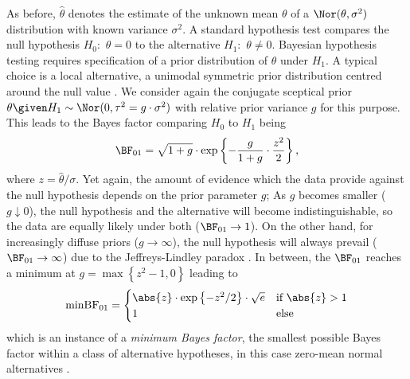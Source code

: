 As before, $\hat \theta$ denotes the estimate of the unknown mean $\theta$ of a
$\Nor(\theta, \sigma^2)$ distribution with known variance $\sigma^2$. A standard
hypothesis test compares the null hypothesis $H_0\colon$ $\theta = 0$ to the
alternative $H_1\colon$ $\theta \neq 0$. Bayesian hypothesis testing requires
specification of a prior distribution of $\theta$ under $H_1$. A typical choice
is a local alternative, a unimodal symmetric prior distribution centred around
the null value \citep{Johnson2010}. We consider again the conjugate sceptical
prior $\theta \given H_1 \sim \Nor(0, \tau^2 = g \cdot \sigma^2)$ with relative
prior variance $g$ for this purpose. This leads to the Bayes factor comparing
$H_0$ to $H_1$ being
\begin{align}
  \label{eq4:bf01}
  \BF_{01} =
  \sqrt{1 + g} \cdot
  \exp\left\{-\frac{g}{1 + g} \cdot \frac{z^2}{2} \right\},
\end{align}
where $z=\hat \theta/\sigma$. Yet again, the amount of evidence which the data
provide against the null hypothesis depends on the prior parameter $g$; As $g$
becomes smaller ($g \downarrow 0$), the null hypothesis and the alternative will
become indistinguishable, so the data are equally likely under both
($\BF_{01} \to 1$). On the other hand, for increasingly diffuse priors
($g \to \infty$), the null hypothesis will always prevail
($\BF_{01} \to \infty$) due to the Jeffreys-Lindley paradox \citep{Robert2014}.
In between, the $\BF_{01}$ reaches a minimum at
$g = \max\left\{z^2 - 1, 0\right\}$ leading to
\begin{align}
  \text{minBF}_{01} =
  \begin{cases}
    \abs{z} \cdot \exp\left\{-z^2/2\right\} \cdot \sqrt{e}
    & \text{if} ~ \abs{z} > 1 \\
    1 & \text{else}
  \end{cases}
  \label{eq4:minBFnorm}
\end{align}
which is an instance of a \emph{minimum Bayes factor}, the smallest possible
Bayes factor within a class of alternative hypotheses, in this case zero-mean
normal alternatives \citep{Edwards1963, Berger1987, Sellke2001, Held2018}.

